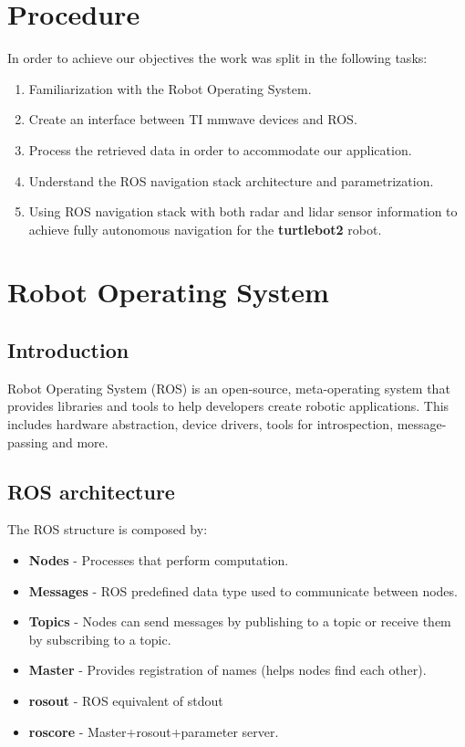 \documentclass[12pt]{article}
\begin{document}
\section{Procedure}
In order to achieve our objectives the work was split in the following tasks:
\begin{enumerate}
    \item Familiarization with the Robot Operating System.
    \item Create an interface between TI mmwave devices and ROS.
    \item Process the retrieved data in order to  accommodate our application.
    \item Understand the ROS navigation stack architecture and parametrization.
    \item Using ROS navigation stack with both radar and lidar sensor information to achieve fully autonomous navigation for the \textbf{turtlebot2} robot.
\end{enumerate}
\section{Robot Operating System}

\subsection{Introduction}
Robot Operating System (ROS) is an open-source, meta-operating system that provides libraries and tools to help developers create robotic applications. This includes hardware abstraction, device drivers, tools for introspection, message-passing and more.
\subsection{ROS architecture}
The ROS structure is composed by:
\begin{itemize}
\item \textbf{Nodes} - Processes that perform computation.
\item \textbf{Messages} - ROS predefined data type used to communicate between nodes. 
\item \textbf{Topics} - Nodes can send messages by publishing to a topic or receive them by subscribing to a topic. 
\item \textbf{Master} - Provides registration of names (helps nodes find each other).
\item \textbf{rosout} - ROS equivalent of stdout 
\item \textbf{roscore} - Master+rosout+parameter server. 
\end{itemize}
\end{document}
